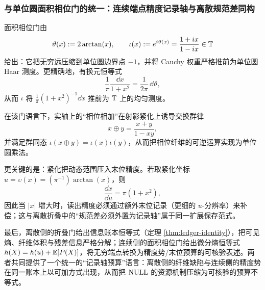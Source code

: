 \subsubsection{与单位圆面积相位门的统一：连续端点精度记录轴与离散规范差同构}
面积相位门由
$$
\vartheta(x):=2\arctan(x),\qquad \iota(x):=e^{i\vartheta(x)}=\frac{1+ix}{1-ix}\in\mathbb{T}
$$
给出：它把无穷远压缩到单位圆边界点 $-1$，并将 Cauchy 权重严格推前为单位圆 Haar 测度。更精确地，有换元恒等式
$$
\frac{1}{\pi}\frac{\dd x}{1+x^2}=\frac{1}{2\pi}\,\dd\vartheta,
$$
从而 $\iota$ 将 $\frac{1}{\pi}(1+x^2)^{-1}\dd x$ 推前为 $\mathbb{T}$ 上的均匀测度。
\par
在该门语言下，实轴上的“相位相加”在射影紧化上诱导交换群律
$$
x\oplus y=\frac{x+y}{1-xy},
$$
并满足群同态 $\iota(x\oplus y)=\iota(x)\iota(y)$，从而把相位纤维的可逆运算实现为单位圆乘法。
\par
更关键的是：紧化把动态范围压入末位精度。若取紧化坐标 $u=\upsilon(x)=(\pi^{-1})\arctan(x)$，则
$$
\frac{\dd x}{\dd u}=\pi(1+x^{2}),
$$
因此当 $|x|$ 增大时，读出精度必须通过额外末位记录（更细的 $u$-分辨率）来补偿；这与离散折叠中的“规范差必须外置为记录轴”属于同一扩展保存范式。
\par
最后，离散侧的折叠门给出信息账本恒等式（定理 \ref{thm:ledger-identity}），把可见熵、纤维体积与残差信息严格分解；连续侧的面积相位门给出微分熵恒等式 $h(X)=h(u)+\mathbb{E}[P(X)]$，将无穷端点转换为精度势/末位预算的可核验表述。两者共同提供了一个统一的“记录轴预算”语言：离散侧的纤维缺陷与连续侧的精度势在同一账本上以可加方式出现，从而把 $\mathrm{NULL}$ 的资源机制压缩为可核验的预算不等式。

